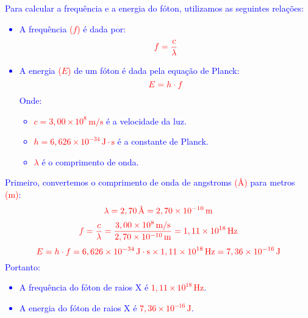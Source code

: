 \documentclass[a4paper, 12pt]{article}
\begin{document}
\begin{enumerate}
	      \textcolor{blue}{
		      Para calcular a frequência e a energia do fóton, utilizamos as seguintes relações:
		      \begin{itemize}
			      \item[] A frequência \textcolor{red}{(\(f\))} é dada por:
			            \[
				            \textcolor{red}{f = \frac{c}{\lambda}}
			            \]
			      \item[] A energia \textcolor{red}{(\(E\))} de um fóton é dada pela equação de Planck:
			            \[
				            \textcolor{red}{E = h \cdot f}
			            \]
			            Onde:
			            \begin{itemize}
				            \item[] \textcolor{red}{\(c = 3,00 \times 10^8 \, \text{m/s}\)} é a velocidade da luz.
				            \item[] \textcolor{red}{\(h = 6,626 \times 10^{-34} \, \text{J} \cdot \text{s}\)} é a constante de Planck.
				            \item[] \textcolor{red}{\(\lambda\)} é o comprimento de onda.
			            \end{itemize}
		      \end{itemize}
		      Primeiro, convertemos o comprimento de onda de angstroms \textcolor{red}{(Å)} para metros \textcolor{red}{(m)}:
		      \[
			      \textcolor{red}{\lambda = 2,70 \, \text{Å} = 2,70 \times 10^{-10} \, \text{m}}
		      \]
		      \[
			      \textcolor{red}{f = \frac{c}{\lambda} = \frac{3,00 \times 10^8 \, \text{m/s}}{2,70 \times 10^{-10} \, \text{m}} = 1,11 \times 10^{18} \, \text{Hz}}
		      \]
		      \[
			      \textcolor{red}{E = h \cdot f = 6,626 \times 10^{-34} \, \text{J} \cdot \text{s} \times 1,11 \times 10^{18} \, \text{Hz} = 7,36 \times 10^{-16} \, \text{J}}
		      \]
		      Portanto:
		      \begin{itemize}
			      \item[] A frequência do fóton de raios X é \textcolor{red}{\(1,11 \times 10^{18} \, \text{Hz}\)}.
			      \item[] A energia do fóton de raios X é \textcolor{red}{\(7,36 \times 10^{-16} \, \text{J}\)}.
		      \end{itemize}
	      }
	      

\end{enumerate}
\end{document}
